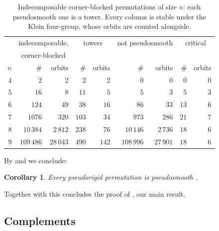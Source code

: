 \documentclass[12pt]{article}
\def\xspace{ }%
\newtheorem{corollary}[corollary]{Corollary}
\theoremstyle{definition}
\newcommand{\prig}{pseudorigid\xspace}
\newcommand{\psm}{pseudosmooth\xspace}
\newcommand{\cb}{corner-blocked\xspace}
\begin{document}
\begin{table}[htbp]
\centering
\renewcommand{\arraystretch}{1.2}
\begin{tabular}{@{}r@{\quad}rr@{\qquad}rr@{\qquad}rr@{\qquad}rr@{}}
\hline
 & \multicolumn{2}{c}{indecomposable,} & \multicolumn{2}{c}{towers}
 & \multicolumn{2}{c}{not \psm} & \multicolumn{2}{c}{critical}\\
 & \multicolumn{2}{c}{\cb} & & & & & &\\
$n$ & \# & orbits & \# & orbits & \# & orbits & \# & orbits\\
\hline
$4$ & $2$        & $2$       & $2$   & $2$   & $0$        & $0$       & $0$  & $0$\\
$5$ & $16$       & $8$       & $11$  & $5$   & $5$        & $3$       & $5$  & $3$\\
$6$ & $124$      & $49$      & $38$  & $16$  & $86$       & $33$      & $13$ & $6$\\
$7$ & $1076$     & $320$     & $103$ & $34$  & $973$      & $286$     & $21$ & $7$\\
$8$ & $10\,384$  & $2\,812$  & $238$ & $76$  & $10\,146$  & $2\,736$  & $18$ & $6$\\
$9$ & $109\,486$ & $28\,043$ & $490$ & $142$ & $108\,996$ & $27\,901$ & $18$ & $6$\\
\hline
\end{tabular}
\caption{Indecomposable \cb permutations of size $n$: each
\psm one is a tower. Every column is stable under the Klein four-group,
whose orbits are counted alongside.}
\label{tab:census}
\end{table}


By  and  we conclude:
\begin{corollary}\label{cor:converse}
Every \prig permutation is \psm.
\end{corollary}

Together with  this concludes the proof of , our main result.

\subsection{Complements}\label{ssec:complements}
\end{document}
